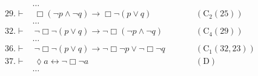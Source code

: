 \documentclass[a4paper, 12pt]{report}
\begin{document}
{{\begin{equation*}
\begin{alignedat}{2}
                               & \ldots && \\
                    29. \vdash & \ \Box (\lnot p \land \lnot q) \to \Box \lnot (p \lor q) && \quad \quad (\mbox{C}_2(25)) \\
                               & \ldots && \\
                    32. \vdash & \ \lnot \Box \lnot (p \lor q) \to \lnot \Box (\lnot p \land \lnot q) && \quad \quad (\mbox{C}_4(29)) \\
                               & \ldots && \\
                    36. \vdash & \ \lnot \Box \lnot (p \lor q) \to \lnot \Box \lnot p \lor \lnot \Box \lnot q && \quad \quad (\mbox{C}_1(32, 23)) \\
                    37. \vdash & \ \lozenge a \leftrightarrow \lnot \Box \lnot a && \quad \quad (\mbox{D}) \\
                               & \ldots && \\
                \end{alignedat}
            \end{equation*}

}}
\end{document}
